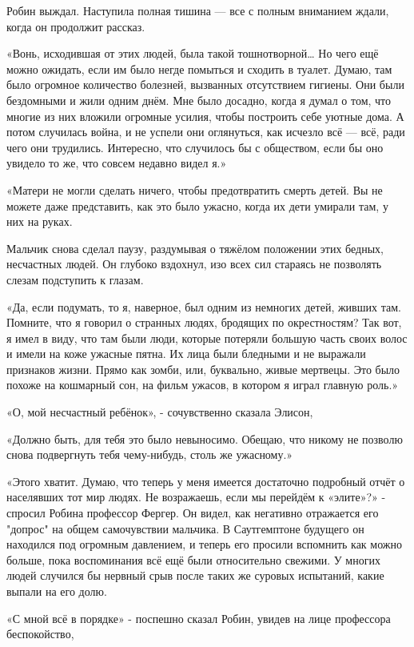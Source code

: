 \documentclass[a4paper,12pt]{book}
\begin{document}
\par
Робин выждал. Наступила полная тишина — все с полным вниманием ждали, когда он продолжит рассказ.
\par
«Вонь, исходившая от этих людей, была такой тошнотворной… Но чего ещё можно ожидать, если им было негде помыться и сходить в туалет. Думаю, там было огромное количество болезней, вызванных отсутствием гигиены. Они были бездомными и жили одним днём. Мне было досадно, когда я думал о том, что многие из них вложили огромные усилия, чтобы построить себе уютные дома. А потом случилась война, и не успели они оглянуться, как исчезло всё — всё, ради чего они трудились. Интересно, что случилось бы с обществом, если бы оно увидело то же, что совсем недавно видел я.»
\par
«Матери не могли сделать ничего, чтобы предотвратить смерть детей. Вы не можете даже представить, как это было ужасно, когда их дети умирали там, у них на руках.
\par
Мальчик снова сделал паузу, раздумывая о тяжёлом положении этих бедных, несчастных людей. Он глубоко вздохнул, изо всех сил стараясь не позволять слезам подступить к глазам.
\par
«Да, если подумать, то я, наверное, был одним из немногих детей, живших там. Помните, что я говорил о странных людях, бродящих по окрестностям? Так вот, я имел в виду, что там были люди, которые потеряли большую часть своих волос и имели на коже ужасные пятна. Их лица были бледными и не выражали признаков жизни. Прямо как зомби, или, буквально, живые мертвецы. Это было похоже на кошмарный сон, на фильм ужасов, в котором я играл главную роль.»
\par
«О, мой несчастный ребёнок», - сочувственно сказала Элисон,
\par
«Должно быть, для тебя это было невыносимо. Обещаю, что никому не позволю снова подвергнуть тебя чему-нибудь, столь же ужасному.»
\par
«Этого хватит. Думаю, что теперь у меня имеется достаточно подробный отчёт о населявших тот мир людях. Не возражаешь, если мы перейдём к «элите»?» - спросил Робина профессор Фергер. Он видел, как негативно отражается его "допрос" на общем самочувствии мальчика. В Саутгемптоне будущего он находился под огромным давлением, и теперь его просили вспомнить как можно больше, пока воспоминания всё ещё были относительно свежими. У многих людей случился бы нервный срыв после таких же суровых испытаний, какие выпали на его долю.
\par
«С мной всё в порядке» - поспешно сказал Робин, увидев на лице профессора беспокойство,
\end{document}
